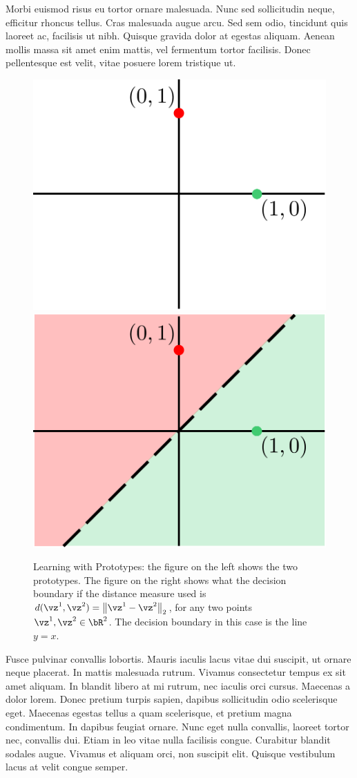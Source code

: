\documentclass[a4paper,11pt]{article}
\begin{document}
\begin{mlsolution}
Morbi euismod risus eu tortor ornare malesuada. Nunc sed sollicitudin neque, efficitur rhoncus tellus. Cras malesuada augue arcu. Sed sem odio, tincidunt quis laoreet ac, facilisis ut nibh. Quisque gravida dolor at egestas aliquam. Aenean mollis massa sit amet enim mattis, vel fermentum tortor facilisis. Donec pellentesque est velit, vitae posuere lorem tristique ut.
\begin{figure}[th]%
\centering
\includegraphics[width=0.3\columnwidth]{proto_blank.png}%
\hfill
\includegraphics[width=0.3\columnwidth]{proto_euclid_sample.png}%
\caption{Learning with Prototypes: the figure on the left shows the two prototypes. The figure on the right shows what the decision boundary if the distance measure used is $d(\vz^1,\vz^2) = \norm{\vz^1-\vz^2}_2$, for any two points $\vz^1,\vz^2 \in \bR^2$. The decision boundary in this case is the line $y = x$.}%
\label{fig:proto}%
\end{figure}
Fusce pulvinar convallis lobortis. Mauris iaculis lacus vitae dui suscipit, ut ornare neque placerat. In mattis malesuada rutrum. Vivamus consectetur tempus ex sit amet aliquam. In blandit libero at mi rutrum, nec iaculis orci cursus. Maecenas a dolor lorem. Donec pretium turpis sapien, dapibus sollicitudin odio scelerisque eget. Maecenas egestas tellus a quam scelerisque, et pretium magna condimentum. In dapibus feugiat ornare. Nunc eget nulla convallis, laoreet tortor nec, convallis dui. Etiam in leo vitae nulla facilisis congue. Curabitur blandit sodales augue. Vivamus et aliquam orci, non suscipit elit. Quisque vestibulum lacus at velit congue semper.

\end{mlsolution}
\end{document}
